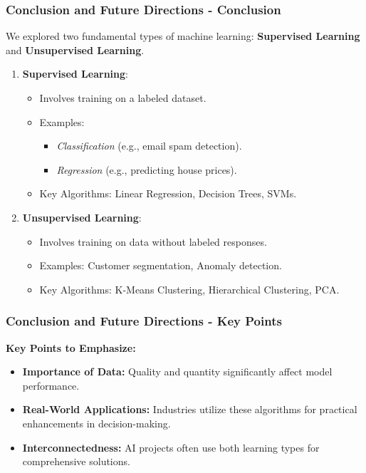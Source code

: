 \documentclass{beamer}
\begin{document}
\begin{frame}[fragile]
    \frametitle{Conclusion and Future Directions - Conclusion}
    
    We explored two fundamental types of machine learning: 
    \textbf{Supervised Learning} and \textbf{Unsupervised Learning}.
    
    \begin{enumerate}
        \item \textbf{Supervised Learning}:
        \begin{itemize}
            \item Involves training on a labeled dataset.
            \item Examples: 
            \begin{itemize}
                \item \textit{Classification} (e.g., email spam detection).
                \item \textit{Regression} (e.g., predicting house prices).
            \end{itemize}
            \item Key Algorithms: Linear Regression, Decision Trees, SVMs.
        \end{itemize}
        
        \item \textbf{Unsupervised Learning}:
        \begin{itemize}
            \item Involves training on data without labeled responses.
            \item Examples: Customer segmentation, Anomaly detection.
            \item Key Algorithms: K-Means Clustering, Hierarchical Clustering, PCA.
        \end{itemize}
    \end{enumerate}
    
\end{frame}

\begin{frame}[fragile]
    \frametitle{Conclusion and Future Directions - Key Points}
    
    \textbf{Key Points to Emphasize:}
    \begin{itemize}
        \item \textbf{Importance of Data:} Quality and quantity significantly affect model performance.
        \item \textbf{Real-World Applications:} Industries utilize these algorithms for practical enhancements in decision-making.
        \item \textbf{Interconnectedness:} AI projects often use both learning types for comprehensive solutions.
    \end{itemize}
\end{frame}
\end{document}
